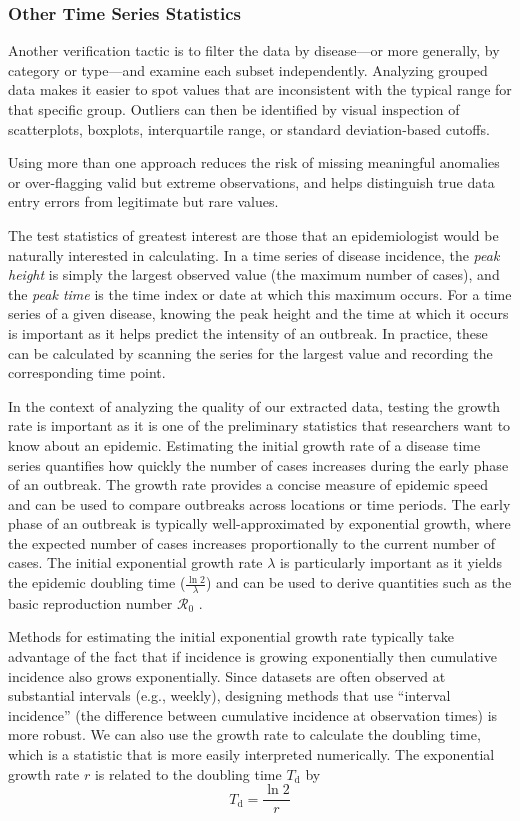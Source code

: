 \documentclass[12pt]{article}
\begin{document}
\subsubsection{Other Time Series Statistics}

Another verification tactic is to filter the data by disease---or more generally, by category or type---and examine each subset independently. Analyzing grouped data makes it easier to spot values that are inconsistent with the typical range for that specific group. Outliers can then be identified by visual inspection of scatterplots, boxplots, interquartile range, or standard deviation-based cutoffs.

Using more than one approach reduces the risk of missing meaningful anomalies or over-flagging valid but extreme observations, and helps distinguish true data entry errors from legitimate but rare values.

The test statistics of greatest interest are those that an epidemiologist would be naturally interested in calculating. In a time series of disease incidence, the \emph{peak height} is simply the largest observed value (the maximum number of cases), and the \emph{peak time} is the time index or date at which this maximum occurs. For a time series of a given disease, knowing the peak height and the time at which it occurs is important as it helps predict the intensity of an outbreak. In practice, these can be calculated by scanning the series for the largest value and recording the corresponding time point. 

In the context of analyzing the quality of our extracted data, testing the growth rate is important as it is one of the preliminary statistics that researchers want to know about an epidemic. Estimating the initial growth rate of a disease time series quantifies how quickly the number of cases increases during the early phase of an outbreak. The growth rate provides a concise measure of epidemic speed and can be used to compare outbreaks across locations or time periods. The early phase of an outbreak is typically well-approximated by exponential growth, where the expected number of cases increases proportionally to the current number of cases. The initial exponential growth rate $\lambda$ is particularly important as it yields the epidemic doubling time ($\frac{\ln{2}}{\lambda}$) and can be used to derive quantities such as the basic reproduction number $\mathcal{R}_0$ \cite{WallLips07}.

Methods for estimating the initial exponential growth rate \cite{Ma2014,JaganRpkg} typically take advantage of the fact that if incidence is growing exponentially then cumulative incidence also grows exponentially. Since datasets are often observed at substantial intervals (e.g., weekly), designing methods that use ``interval incidence'' (the difference between cumulative incidence at observation times) is more robust. We can also use the growth rate to calculate the doubling time, which is a statistic that is more easily interpreted numerically.
The exponential growth rate \(r\) is related to the doubling time $T_{\mathrm{d}}$ by
\[
T_{\mathrm{d}} = \frac{\ln 2}{r}
\]
\end{document}
